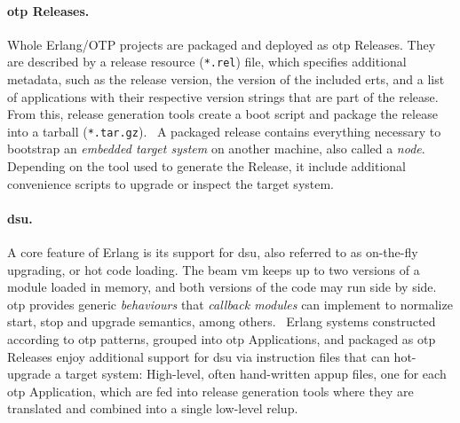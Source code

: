 \paragraph{\acrshort{otp} Releases.} Whole Erlang/OTP projects are packaged and deployed as \acrshort{otp} Releases. They are described by a release resource (\lstinline|*.rel|) file, which specifies additional metadata, such as the release version, the version of the included \acrfull{erts}, and a list of applications with their respective version strings that are part of the release. From this, release generation tools create a boot script and package the release into a tarball (\lstinline|*.tar.gz|).~\cite{doc:otp} A packaged release contains everything necessary to bootstrap an \emph{embedded target system} on another machine, also called a \emph{node}. Depending on the tool used to generate the Release, it include additional convenience scripts to upgrade or inspect the target system.

\paragraph{\acrlong{dsu}.} A core feature of Erlang is its support for \acrfull{dsu}, also referred to as on-the-fly upgrading, or hot code loading. The \acrshort{beam} \acrshort{vm} keeps up to two versions of a module loaded in memory, and both versions of the code may run side by side.~\cite{cesarini:otp} \acrshort{otp} provides generic \emph{behaviours} that \emph{callback modules} can implement to normalize start, stop and upgrade semantics, among others.~\cite{doc:otp} Erlang systems constructed according to \acrshort{otp} patterns, grouped into \acrshort{otp} Applications, and packaged as \acrshort{otp} Releases enjoy additional support for \acrshort{dsu} via instruction files that can hot-upgrade a target system: High-level, often hand-written \acrfull{appup} files, one for each \acrshort{otp} Application, which are fed into release generation tools where they are translated and combined into a single low-level \acrshort{relup}.\cite{doc:otp}


